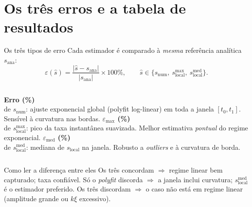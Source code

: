 \documentclass[aspectratio=169,11pt]{beamer}
\newcommand{\snum}{s_{\mathrm{num}}}
\newcommand{\sana}{s_{\mathrm{ana}}}
\newcommand{\sloc}{s_{\mathrm{local}}}
\newcommand{\slocmax}{s_{\mathrm{local}}^{\max}}
\newcommand{\slocmed}{s_{\mathrm{local}}^{\mathrm{med}}}
\begin{document}
\section{Os três erros e a tabela de resultados}
\begin{frame}{Os três tipos de erro}
  Cada estimador é comparado à \emph{mesma} referência analítica $\sana$:
  \begin{equation*}
    \varepsilon(\hat s) = \frac{|\hat s - \sana|}{|\sana|}\times 100\%,
    \qquad \hat s \in \{\snum,\ \slocmax,\ \slocmed\}.
  \end{equation*}
  \begin{columns}[T]
    \textbf{Erro (\%)}\\
    \footnotesize de $\snum$: ajuste exponencial global (polyfit log-linear)
    em toda a janela $[t_0,t_1]$. Sensível à curvatura nas bordas.
    \textbf{$\varepsilon_{\max}$ (\%)}\\
    \footnotesize de $\slocmax$: pico da taxa instantânea suavizada.
    Melhor estimativa \emph{pontual} do regime exponencial.
    \textbf{$\varepsilon_{\mathrm{med}}$ (\%)}\\
    \footnotesize de $\slocmed$: mediana de $\sloc$ na janela.
    Robusto a \emph{outliers} e à curvatura de borda.
  \end{columns}
  \vspace{0.6em}
  \begin{block}{Como ler a diferença entre eles}
    \footnotesize
    Os três concordam $\Rightarrow$ regime linear bem capturado; taxa confiável.
    Só o \emph{polyfit} discorda $\Rightarrow$ a janela inclui curvatura;
    $\slocmed$ é o estimador preferido. Os três discordam $\Rightarrow$ o caso
    não está em regime linear (amplitude grande ou $k\xi$ excessivo).
  \end{block}
\end{frame}
\end{document}
